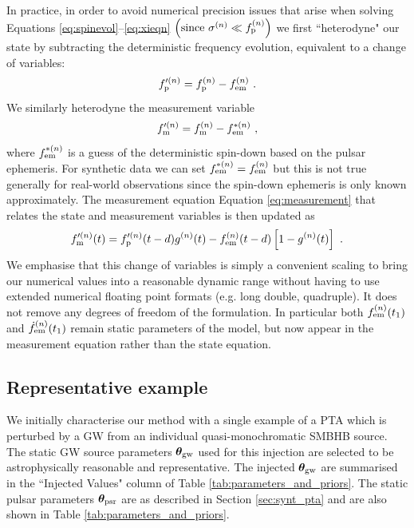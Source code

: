 \documentclass[fleqn,usenatbib,useAMS]{mnras}
\begin{document}
In practice, in order to avoid numerical precision issues that arise when solving Equations \eqref{eq:spinevol}--\eqref{eq:xieqn} $\left ( \text{since } \sigma^{(n)} \ll f_{\rm p}^{(n)} \right)$ we first ``heterodyne" our state by subtracting the deterministic frequency evolution, equivalent to a change of variables:
\begin{equation}
	f_{\rm p}^{\prime (n)} = f_{\rm p}^{(n)} - f_{\rm em}^{(n)} \ .
\end{equation}  
We similarly heterodyne the measurement variable 
\begin{equation}
	f_{\rm m}^{\prime (n)} = f_{\rm m}^{(n)} - f_{\rm em}^{*(n)} \ ,
\end{equation}
where $ f_{\rm em}^{*(n)}$ is a guess of the deterministic spin-down based on the pulsar ephemeris. For synthetic data we can set $ f_{\rm em}^{*(n)} = f_{\rm em}^{(n)}$ but this is not true generally for real-world observations since the spin-down ephemeris is only known approximately. The measurement equation Equation \eqref{eq:measurement} that relates the state and measurement variables is then updated as 
\begin{equation}
	f_{\rm m}^{\prime (n)}(t) = f_{\rm p}^{\prime (n)}(t-d) g^{(n)}(t) -  f_{\rm em}^{(n)}(t-d)\left[ 1-g^{(n)}(t)\right] \ .
	\label{eq:measurement_cov}
\end{equation}
We emphasise that this change of variables is simply a convenient scaling to bring our numerical values into a reasonable dynamic range without having to use extended numerical floating point formats (e.g. long double, quadruple). It does not remove any degrees of freedom of the formulation. In particular both $f_{\rm em}^{(n)}(t_1)$
and $\dot{f}_{\rm em}^{(n)}(t_1)$ remain static parameters of the model, but now appear in the measurement equation rather than the state equation.


\subsection{Representative example}\label{sec:rep_example}
We initially characterise our method with a single example of a PTA which is perturbed by a GW from an individual quasi-monochromatic SMBHB source. The static GW source parameters $\boldsymbol{\theta}_{\rm gw}$ used for this injection are selected to be astrophysically reasonable and representative. The injected $\boldsymbol{\theta}_{\rm gw}$ are summarised in the ``Injected Values" column of Table \ref{tab:parameters_and_priors}. The static pulsar parameters $\boldsymbol{\theta}_{\rm psr}$ are as described in Section \ref{sec:synt_pta} and are also shown in Table \ref{tab:parameters_and_priors}. 
\end{document}
